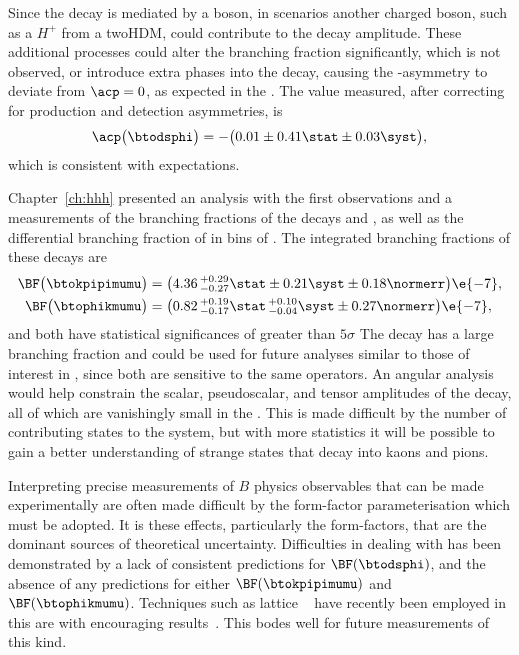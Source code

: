 Since the decay \btodsphi is mediated by a \Wp boson, in \np scenarios another charged boson, such
as a $H^+$ from a \gls{twoHDM}, could contribute to the decay amplitude.
These additional processes could alter the branching fraction significantly, which is not observed,
or introduce extra phases into the decay, causing the \CP-asymmetry to deviate from $\acp=0$, as
expected in the \sm.
The value measured, after correcting for production and detection asymmetries, is
\begin{equation*}
  \acp\big(\btodsphi\big)=
  -\big(0.01\pm0.41\stat\pm0.03\syst\big),
\end{equation*}
which is consistent with \sm expectations.



Chapter~\ref{ch:hhh} presented an analysis with the first observations and a measurements of the
branching fractions of the decays \btokpipimumu and \btophikmumu, as well as the
differential branching fraction of \btokpipimumu in bins of \qsq.
The integrated branching fractions of these decays are
\begin{align*}
  \BF\big( \btokpipimumu \big)&=
  \big(4.36\,^{+0.29}_{-0.27}\stat\pm0.21\syst\pm0.18\normerr\big)\e{-7}, \\
  \BF\big(\btophikmumu\big)&=
  \big(0.82\,^{+0.19}_{-0.17}\stat\,^{+0.10}_{-0.04}\syst\pm0.27\normerr\big)\e{-7},
\end{align*}
and both have statistical significances of greater than $5\sigma$
The decay \btokpipimumu has a large branching fraction and could be used for future analyses
similar to those of interest in \btokstrmumu, since both are sensitive to the same operators.
An angular analysis would help constrain the scalar, pseudoscalar, and tensor amplitudes of the
decay, all of which are vanishingly small in the \sm.
This is made difficult by the number of contributing states to the \kpipi system,
but with more statistics it will be possible to gain a better understanding of
strange states that decay into kaons and pions.

Interpreting precise measurements of $B$ physics observables that can be made
experimentally are often made difficult by the form-factor parameterisation which must be adopted.
It is these \QCD effects, particularly the form-factors, that are the dominant sources of
theoretical uncertainty.
Difficulties in dealing with \QCD has been demonstrated by a lack of consistent predictions for
$\BF(\btodsphi)$, and the absence of any predictions for either $\BF(\btokpipimumu)$ and
$\BF(\btophikmumu)$.
Techniques such as lattice \QCD~\cite{Bouchard:2013pna} have recently been employed in this are
with encouraging results~\cite{RotheLattice}.
This bodes well for future measurements of this kind.

